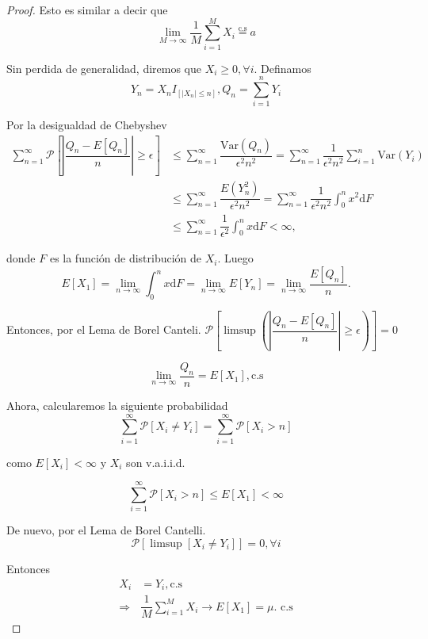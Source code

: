 \documentclass[
  letterpaper,
  DIV=11,
  numbers=noendperiod]{scrreprt}
\theoremstyle{plain}
\theoremstyle{definition}
\theoremstyle{remark}
\begin{document}
\begin{proof}

Esto es similar a decir que \[
\lim_{M\to\infty}\dfrac{1}{M}\sum_{i=1}^{M}X_{i}\stackrel{\text{c.s}}{=}a
\]

Sin perdida de generalidad, diremos que \(X_{i}\geq0,\forall i\).
Definamos \[
Y_{n}=X_{n}I_{\left[\left|X_{n}\right|\leq n\right]},Q_{n}=\sum_{i=1}^{n}Y_{i}
\]

Por la desigualdad de Chebyshev \[
\begin{align*}
\sum_{n=1}^{\infty}\mathcal{P}\left[\left|\dfrac{Q_{n}-E\left[Q_{n}\right]}{n}\right|\geq\epsilon\right] & \leq\sum_{n=1}^{\infty}\dfrac{\text{Var}\left(Q_{n}\right)}{\epsilon^{2}n^{2}}=\sum_{n=1}^{\infty}\dfrac{1}{\epsilon^{2}n^{2}}\sum_{i=1}^{n}\text{Var}\left(Y_{i}\right)\\
& \leq\sum_{n=1}^{\infty}\dfrac{E\left(Y_{n}^{2}\right)}{\epsilon^{2}n^{2}}=\sum_{n=1}^{\infty}\dfrac{1}{\epsilon^{2}n^{2}}\int_{0}^{n}x^{2}\mathrm{d}F\\
& \leq\sum_{n=1}^{\infty}\dfrac{1}{\epsilon^{2}}\int_{0}^{n}x\mathrm{d}F<\infty,
\end{align*}
\]

donde \(F\) es la función de distribución de \(X_{i}\). Luego \[
E\left[X_{1}\right]=\lim_{n\to\infty}\int_{0}^{n}x\mathrm{d}F=\lim_{n\to\infty}E\left[Y_{n}\right]=\lim_{n\to\infty}\dfrac{E\left[Q_{n}\right]}{n}.
\]

Entonces, por el Lema de Borel Canteli.
\(\mathcal{\mathcal{P}}\left[\limsup\left(\left|\dfrac{Q_{n}-E\left[Q_{n}\right]}{n}\right|\geq\epsilon\right)\right]=0\)

\[
\lim_{n\to\infty}\dfrac{Q_{n}}{n}=E\left[X_{1}\right],\text{c.s}
\]

Ahora, calcularemos la siguiente probabilidad \[
\sum_{i=1}^{\infty}\mathcal{P}\left[X_{i}\neq Y_{i}\right]=\sum_{i=1}^{\infty}\mathcal{P}\left[X_{i}>n\right]
\]

como \(E\left[X_{i}\right]<\infty\) y \(X_{i}\) son v.a.i.i.d.

\[
\sum_{i=1}^{\infty}\mathcal{P}\left[X_{i}>n\right]\leq E\left[X_{1}\right]<\infty
\]

De nuevo, por el Lema de Borel Cantelli. \[
\mathcal{P}\left[\limsup\left[X_{i}\neq Y_{i}\right]\right]=0,\forall i
\]

Entonces \[
\begin{align*}
X_{i} & =Y_{i},\text{c.s}\\
\Rightarrow & \dfrac{1}{M}\sum_{i=1}^{M}X_{i}\to E\left[X_{1}\right]=\mu.\text{ c.s}
\end{align*}
\]

\end{proof}
\end{document}
